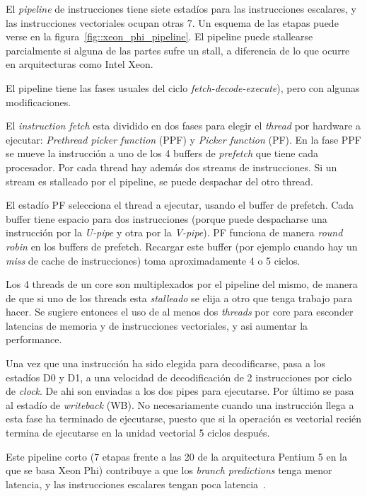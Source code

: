 El \textit{pipeline} de instrucciones tiene siete estad\'ios para las instrucciones escalares, y las
instrucciones vectoriales ocupan otras 7. Un esquema de las etapas puede verse en la figura~\ref{fig::xeon_phi_pipeline}.
El pipeline puede stallearse parcialmente si alguna de las partes sufre un stall, a diferencia de lo que ocurre en 
arquitecturas como Intel Xeon.

El pipeline tiene las fases usuales del ciclo \textit{fetch-decode-execute}), pero con algunas modificaciones.

El \textit{instruction fetch} esta dividido en dos fases para elegir el \textit{thread} por hardware a ejecutar:
\textit{Prethread picker function} (PPF) y \textit{Picker function} (PF). En la fase PPF se mueve la instrucci\'on
a uno de los 4 buffers de \textit{prefetch} que tiene cada procesador. Por cada thread hay adem\'as dos streams de
instrucciones. Si un stream es stalleado por el pipeline, se puede despachar del otro thread.

El estad\'io PF selecciona el thread a ejecutar, usando el buffer de prefetch. Cada buffer tiene espacio para dos
instrucciones (porque puede despacharse una instrucci\'on por la \textit{U-pipe} y otra por la \textit{V-pipe}). PF
funciona de manera \textit{round robin} en los buffers de prefetch. Recargar este buffer (por ejemplo cuando hay un
\textit{miss} de cache de instrucciones) toma aproximadamente 4 o 5 ciclos.

Los 4 threads de un core son multiplexados por el pipeline del mismo, de manera de que si uno de los threads esta
\textit{stalleado} se elija a otro que tenga trabajo para hacer. Se sugiere entonces el uso de al menos dos 
\textit{threads} por core para esconder latencias de memoria y de instrucciones vectoriales, y asi aumentar la performance.

Una vez que una instrucci\'on ha sido elegida para decodificarse, pasa a los estad\'ios D0 y D1, a una velocidad de
decodificaci\'on de 2 instrucciones por ciclo de \textit{clock}. De ahi son enviadas a los dos pipes para ejecutarse.
Por \'ultimo se pasa al estad\'io de \textit{writeback} (WB). No necesariamente cuando una instrucci\'on llega a esta
fase ha terminado de ejecutarse, puesto que si la operaci\'on es vectorial reci\'en termina de ejecutarse en la unidad
vectorial 5 ciclos despu\'es.

Este pipeline corto (7 etapas frente a las 20 de la arquitectura Pentium 5 en la que se basa Xeon Phi) contribuye a que
los \textit{branch predictions} tenga menor latencia, y las instrucciones escalares tengan poca latencia~\cite{IntelXeonPhiWhitePaper}.

